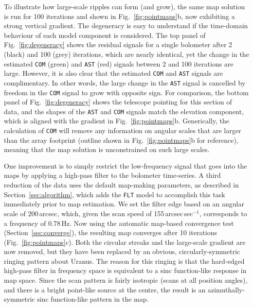 \documentclass[useAMS,usenatbib,nofootinbib]{mn2e}
\def\sinc{\mathrm{sinc}}
\newcommand{\model}[1]{\texttt{#1}}
\begin{document}
To illustrate how large-scale ripples can form (and grow), the same
map solution is run for 100 iterations and shown in
Fig.~\ref{fig:pointmaps}b, now exhibiting a strong vertical
gradient. The degeneracy is easy to understand if the time-domain
behaviour of each model component is considered. The top panel of
Fig.~\ref{fig:degeneracy} shows the residual signals for a single
bolometer after 2 (black) and 100 (grey) iterations, which are nearly
identical, yet the change in the estimated \model{COM} (green) and
\model{AST} (red) signals between 2 and 100 iterations are
large. However, it is also clear that the estimated \model{COM} and
\model{AST} signals are complimentary. In other words, the large
change in the \model{AST} signal is cancelled by freedom in the
\model{COM} signal to grow with opposite sign. For comparison, the
bottom panel of Fig.~\ref{fig:degeneracy} shows the telescope pointing
for this section of data, and the shapes of the \model{AST} and
\model{COM} signals match the elevation component, which is aligned
with the gradient in Fig.~\ref{fig:pointmaps}b. Generically, the
calculation of \model{COM} will remove any information on angular
scales that are larger than the array footprint (outline shown in
Fig.~\ref{fig:pointmaps}b for reference), meaning that the map
solution is unconstrained on such large scales.

One improvement is to simply restrict the low-frequency signal that
goes into the maps by applying a high-pass filter to the bolometer
time-series. A third reduction of the data uses the default map-making
parameters, as described in Section~\ref{sec:algorithm}, which adds
the \model{FLT} model to accomplish this task immediately prior to map
estimation. We set the filter edge based on an angular scale of
200\,arcsec, which, given the scan speed of 155\,arcsec\,sec$^{-1}$,
corresponds to a frequency of 0.78\,Hz. Now using the automatic
map-based convergence test (Section~\ref{sec:converge}), the resulting
map converges after 10 iterations (Fig.~\ref{fig:pointmaps}c). Both
the circular streaks and the large-scale gradient are now removed, but
they have been replaced by an obvious, circularly-symmetric ringing
pattern about Uranus. The reason for this ringing is that the
hard-edged high-pass filter in frequency space is equivalent to a
$\sinc$ function-like response in map space. Since the scan pattern is
fairly isotropic (scans at all position angles), and there is a bright
point-like source at the centre, the result is an
azimuthally-symmetric $\sinc$ function-like pattern in the map.
\end{document}
